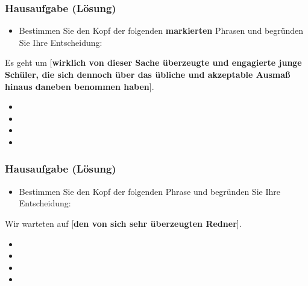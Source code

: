 \begin{frame}
\frametitle{Hausaufgabe (Lösung)} 

\begin{itemize}
	\item Bestimmen Sie den Kopf der folgenden \textbf{markierten} Phrasen und begründen Sie Ihre Entscheidung:
\end{itemize}
	
	\ea Es geht um [\textbf{wirklich von dieser Sache überzeugte und engagierte junge Schüler, die sich dennoch über das übliche und akzeptable Ausmaß hinaus daneben benommen haben}].
	\z

\pause 

	
\begin{itemize}
	\item {}
	\item {}
	\item {}
	\item {}
\end{itemize}

	
\end{frame}


\begin{frame}
\frametitle{Hausaufgabe (Lösung)} 

\begin{itemize}
	\item Bestimmen Sie den Kopf der folgenden Phrase und begründen Sie Ihre Entscheidung:
\end{itemize}

\ea Wir warteten auf [\textbf{den von sich sehr überzeugten Redner}].
\z 

\pause 

\begin{itemize}
	\item {}
	\item {}
	\item {}
	\item {}
\end{itemize}
	
	
\end{frame}


